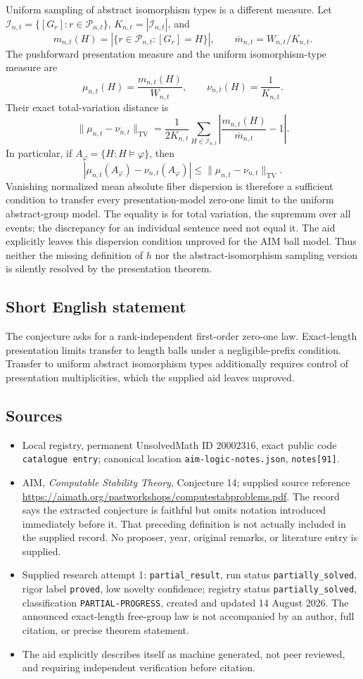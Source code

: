 \documentclass[11pt]{article}
\begin{document}
Uniform sampling of abstract isomorphism types is a different measure. Let \(\mathcal I_{n,t}=\{[G_r]:r\in\mathcal P_{n,t}\}\), \(K_{n,t}=|\mathcal I_{n,t}|\), and
\[
 m_{n,t}(H)=|\{r\in\mathcal P_{n,t}:[G_r]=H\}|,\qquad
 \overline m_{n,t}=W_{n,t}/K_{n,t}.
\]
The pushforward presentation measure and the uniform isomorphism-type measure are
\[
 \mu_{n,t}(H)=\frac{m_{n,t}(H)}{W_{n,t}},\qquad
 \nu_{n,t}(H)=\frac1{K_{n,t}}.
\]
Their exact total-variation distance is
\[
 \|\mu_{n,t}-\nu_{n,t}\|_{\mathrm{TV}}
 =\frac1{2K_{n,t}}\sum_{H\in\mathcal I_{n,t}}
 \left|\frac{m_{n,t}(H)}{\overline m_{n,t}}-1\right|.
\]
In particular, if \(A_\varphi=\{H:H\models\varphi\}\), then
\[
 |\mu_{n,t}(A_\varphi)-\nu_{n,t}(A_\varphi)|
 \le\|\mu_{n,t}-\nu_{n,t}\|_{\mathrm{TV}}.
\]
Vanishing normalized mean absolute fiber dispersion is therefore a sufficient condition to transfer every presentation-model zero-one limit to the uniform abstract-group model. The equality is for total variation, the supremum over all events; the discrepancy for an individual sentence need not equal it. The aid explicitly leaves this dispersion condition unproved for the AIM ball model. Thus neither the missing definition of \(h\) nor the abstract-isomorphism sampling version is silently resolved by the presentation theorem.
\subsection{Short English statement}
The conjecture asks for a rank-independent first-order zero-one law. Exact-length presentation limits transfer to length balls under a negligible-prefix condition. Transfer to uniform abstract isomorphism types additionally requires control of presentation multiplicities, which the supplied aid leaves unproved.
\subsection{Sources}
\begin{itemize}
\item Local registry, permanent UnsolvedMath ID \(20002316\), exact public code \texttt{catalogue entry}; canonical location \texttt{aim-logic-notes.json}, \texttt{notes[91]}.
\item AIM, \emph{Computable Stability Theory}, Conjecture 14; supplied source reference \url{https://aimath.org/pastworkshops/computestabproblems.pdf}. The record says the extracted conjecture is faithful but omits notation introduced immediately before it. That preceding definition is not actually included in the supplied record. No proposer, year, original remarks, or literature entry is supplied.
\item Supplied research attempt 1: \texttt{partial\_result}, run status \texttt{partially\_solved}, rigor label \texttt{proved}, low novelty confidence; registry status \texttt{partially\_solved}, classification \texttt{PARTIAL-PROGRESS}, created and updated 14 August 2026. The announced exact-length free-group law is not accompanied by an author, full citation, or precise theorem statement.
\item The aid explicitly describes itself as machine generated, not peer reviewed, and requiring independent verification before citation.
\end{itemize}
\end{document}
